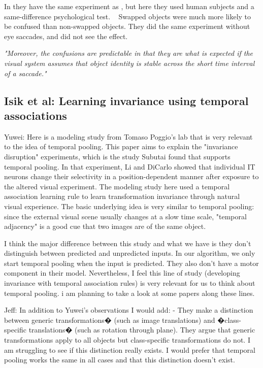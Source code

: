 \documentclass{article} %
\begin{document}
In \cite{Cox2005} they have the same experiment as \cite{Li2008}, but
here they used human subjects and a same-difference psychological test.  
Swapped objects were much more likely to be confused than non-swapped objects.
They did the same experiment without eye saccades, and did not see the effect. 

\emph{"Moreover, the confusions are predictable in that they are what is
expected if the visual system assumes that object identity is stable across the short time
interval of a saccade."}


\subsection{Isik et al: Learning invariance using temporal associations}

Yuwei: Here \cite{Isik2012} is a modeling study from Tomaso Poggio's lab that
 is very
relevant to the idea of temporal pooling. This paper aims to explain the
"invariance disruption" experiments, which is the study Subutai found that
supports temporal pooling. In that experiment, Li and DiCarlo
\cite{Li2008} showed that
individual IT neurons change their selectivity in a position-dependent manner
after exposure to the altered visual experiment. The modeling study here used a
temporal association learning rule to learn transformation invariance through
natural visual experience. The basic underlying idea is very similar to temporal
pooling: since the external visual scene usually changes at a slow time scale,
"temporal adjacency" is a good cue that two images are of the same object.

I think the major difference between this study and what we have is they don't
distinguish between predicted and unpredicted inputs. In our algorithm, we only
start temporal pooling when the input is predicted. They also don't have a motor
component in their model. Nevertheless, I feel this line of study (developing
invariance with temporal association rules) is very relevant for us to think
about temporal pooling. i am planning to take a look at some papers along these
lines.

Jeff:  In addition to Yuwei's observations I would add:  - They make a
distinction between generic transformations� (such as image translations) and
�class-specific translations� (such as rotation through plane).  They argue that
generic transformations apply to all objects but class-specific transformations
do not.  I am struggling to see if this distinction really exists.  I would
prefer that temporal pooling works the same in all cases and that this
distinction doesn't exist.
\end{document}
